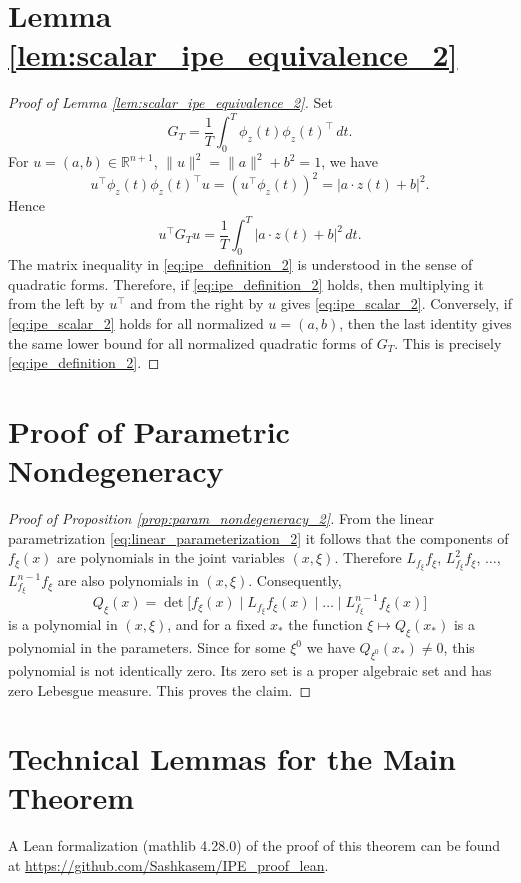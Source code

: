 \documentclass[11pt]{article}
\newcommand{\R}{\mathbb{R}}
\newcommand{\dd}{\,d}
\theoremstyle{thmstyleone}
\theoremstyle{thmstyletwo}
\theoremstyle{thmstylethree}
\begin{document}
\begin{appendices}

\section{Lemma \ref{lem:scalar_ipe_equivalence_2}}\label{secA1}

\begin{proof}[Proof of Lemma \ref{lem:scalar_ipe_equivalence_2}]
Set
\[
    G_T=\frac1T\int_0^T\phi_z(t)\phi_z(t)^\top\dd t.
\]
For $u=(a,b)\in\R^{n+1}$, $\|u\|^2=\|a\|^2+b^2=1$, we have
\[
    u^\top\phi_z(t)\phi_z(t)^\top u
    =(u^\top\phi_z(t))^2
    =|a\cdot z(t)+b|^2.
\]
Hence
\[
    u^\top G_Tu
    =\frac1T\int_0^T |a\cdot z(t)+b|^2\dd t.
\]
The matrix inequality in \eqref{eq:ipe_definition_2} is understood in the sense of quadratic forms. Therefore, if \eqref{eq:ipe_definition_2} holds, then multiplying it from the left by $u^\top$ and from the right by $u$ gives \eqref{eq:ipe_scalar_2}. Conversely, if \eqref{eq:ipe_scalar_2} holds for all normalized $u=(a,b)$, then the last identity gives the same lower bound for all normalized quadratic forms of $G_T$. This is precisely \eqref{eq:ipe_definition_2}.
\end{proof}


\section{Proof of Parametric Nondegeneracy}
\label{app:param_nondegeneracy_2}

\begin{proof}[Proof of Proposition \ref{prop:param_nondegeneracy_2}]
From the linear parametrization \eqref{eq:linear_parameterization_2} it follows that the components of $f_\xi(x)$ are polynomials in the joint variables $(x,\xi)$. Therefore $L_{f_\xi} f_\xi$, $L_{f_\xi}^2 f_\xi$, $\dots$, $L_{f_\xi}^{n-1}f_\xi$ are also polynomials in $(x,\xi)$. Consequently,
\[
    Q_\xi(x)=\det\bigl[f_\xi(x)\mid L_{f_\xi} f_\xi(x)\mid\dots\mid L_{f_\xi}^{n-1}f_\xi(x)\bigr]
\]
is a polynomial in $(x,\xi)$, and for a fixed $x_*$ the function $\xi\mapsto Q_\xi(x_*)$ is a polynomial in the parameters. Since for some $\xi^0$ we have $Q_{\xi^0}(x_*)\ne0$, this polynomial is not identically zero. Its zero set is a proper algebraic set and has zero Lebesgue measure. This proves the claim.
\end{proof}


\section{Technical Lemmas for the Main Theorem}
\label{app:technical_lemmas_2}
A Lean formalization (mathlib 4.28.0) of the proof of this theorem can be found at \url{https://github.com/Sashkasem/IPE_proof_lean}.



\end{appendices}
\end{document}
